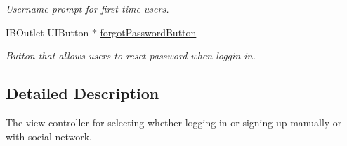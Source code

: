 \begin{DoxyCompactItemize}
\begin{DoxyCompactList}\small\item\em Username prompt for first time users. \end{DoxyCompactList}\item 
\hypertarget{interface_login_sign_up_ad834f5c1778788ef1e52a3f293428e0e}{I\+B\+Outlet U\+I\+Button $\ast$ \hyperlink{interface_login_sign_up_ad834f5c1778788ef1e52a3f293428e0e}{forgot\+Password\+Button}}\label{interface_login_sign_up_ad834f5c1778788ef1e52a3f293428e0e}

\begin{DoxyCompactList}\small\item\em Button that allows users to reset password when loggin in. \end{DoxyCompactList}\end{DoxyCompactItemize}


\subsection{Detailed Description}
The view controller for selecting whether logging in or signing up manually or with social network. 

